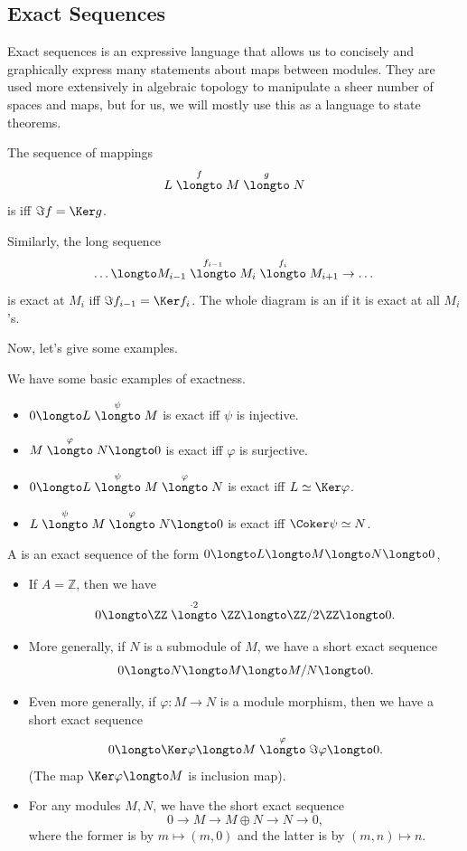 \subsection{Exact Sequences}
Exact sequences is an expressive language that allows
us to concisely and graphically express many statements about
maps between modules.
They are used more extensively in algebraic topology
to manipulate a sheer number of spaces and maps,
but for us, we will mostly use this as a language
to state theorems.
\begin{definition}
    The sequence of mappings
    $$L\stackrel f\longto M \stackrel g\longto N$$
    is  iff $\Im f = \Ker g$.

    Similarly, the long sequence
    $$\dots\longto M_{i-1}\stackrel{f_{i-1}}\longto M_i
    \stackrel{f_i}\longto M_{i+1}\to\dots$$
    is exact at $M_i$ iff $\Im f_{i-1} = \Ker f_i$.
    The whole diagram is an 
    if it is exact at all $M_i$'s.
\end{definition}
Now, let's give some examples.
\begin{example}
We have some basic examples of exactness.
\begin{itemize}
    \item $0\longto L\stackrel\psi\longto M$ is exact iff $\psi$
	is injective.
    \item $M\stackrel\varphi\longto N\longto 0$
	is exact iff $\varphi$ is surjective.
    \item $0\longto L\stackrel\psi\longto M
	\stackrel\varphi\longto N$ is exact iff $L\simeq \Ker\varphi$.
    \item $L\stackrel\psi\longto M
	\stackrel\varphi\longto N\longto 0$ is exact iff
	$\Coker\psi \simeq N$.
\end{itemize}
\end{example}
\begin{definition}
A  is an exact sequence of the form
$0\longto L\longto M\longto N\longto 0$,
\end{definition}
\begin{example}
    \begin{itemize}
    \item If $A=\mathbb Z$, then we have
    $$0 \longto \ZZ \stackrel{\cdot 2}\longto\ZZ 
    \longto \ZZ/2\ZZ \longto 0.$$
    \item 
    More generally, if $N$ is a submodule of $M$,
    we have a short exact sequence
    $$0\longto N\longto M\longto M/N\longto 0.$$
    \item 
    Even more generally, if $\varphi : M\to N$
    is a module morphism, then we have a short exact sequence
    $$0\longto \Ker\varphi \longto M
    \stackrel\varphi\longto \Im\varphi\longto 0.$$
    (The map $\Ker\varphi\longto M$ is inclusion map).
    \item For any modules $M,N$,
    we have the short exact sequence
    $$0\to M\to M\oplus N\to N\to 0,$$
    where the former is by $m\mapsto (m,0)$
    and the latter is by $(m,n)\mapsto n$.
    \end{itemize}
\end{example}
